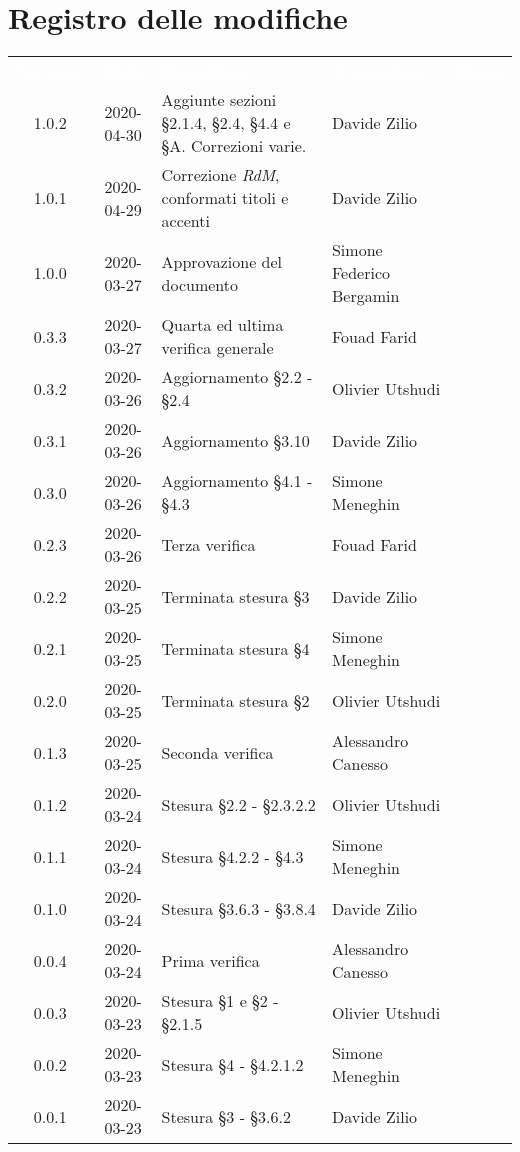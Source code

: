 \section*{Registro delle modifiche}
{
	\centering
	\begin{longtable}{ c c  C{4cm}  C{3cm}  C{3.5cm} }
		\textcolor{white}{\textbf{Versione}} & \textcolor{white}{\textbf{Data}} & \textcolor{white}{\textbf{Descrizione}} & \textcolor{white}{\textbf{Nominativo}} & \textcolor{white}{\textbf{Ruolo}}\\
	1.0.2 & 2020-04-30 & Aggiunte sezioni \S 2.1.4, \S 2.4, \S 4.4 e \S A. Correzioni varie. & Davide Zilio &\adm{} \\
	1.0.1 & 2020-04-29 & Correzione \textit{RdM}, conformati titoli e accenti & Davide Zilio &\adm{} \\	
    1.0.0 & 2020-03-27 & Approvazione del documento & Simone Federico Bergamin &\RdP{} \\
    	0.3.3 & 2020-03-27 & Quarta ed ultima verifica generale & Fouad Farid &\ver{}\\
    	0.3.2 & 2020-03-26 & Aggiornamento \S 2.2 - \S 2.4 & Olivier Utshudi &\adm{}\\
		0.3.1 & 2020-03-26 & Aggiornamento \S 3.10 & Davide Zilio &\adm{}\\
		0.3.0 & 2020-03-26 & Aggiornamento \S 4.1 - \S 4.3  & Simone Meneghin &\adm{}\\
		0.2.3 & 2020-03-26 & Terza verifica & Fouad Farid &\ver{}\\
		0.2.2 & 2020-03-25 & Terminata stesura \S 3  & Davide Zilio &\adm{}\\
    	0.2.1 & 2020-03-25 & Terminata stesura \S 4 & Simone Meneghin &\adm{}\\	
   		0.2.0 & 2020-03-25 & Terminata stesura \S 2 & Olivier Utshudi &\adm{}\\
   		0.1.3 & 2020-03-25 & Seconda verifica & Alessandro Canesso &\ver{}\\
		0.1.2 & 2020-03-24 & Stesura \S 2.2 - \S 2.3.2.2 & Olivier Utshudi &\adm{}\\
		0.1.1 & 2020-03-24 & Stesura \S 4.2.2 - \S 4.3 & Simone Meneghin &\adm{}\\		
		0.1.0 & 2020-03-24 & Stesura \S 3.6.3 - \S 3.8.4 & Davide Zilio &\adm{}\\
		0.0.4 & 2020-03-24 & Prima verifica & Alessandro Canesso &\ver{}\\
		0.0.3 & 2020-03-23 & Stesura \S 1 e \S 2 - \S 2.1.5 & Olivier Utshudi &\adm{}\\
		0.0.2 & 2020-03-23 & Stesura \S 4 - \S 4.2.1.2 & Simone Meneghin &\adm{}\\
		0.0.1 & 2020-03-23 & Stesura \S 3 - \S 3.6.2 & Davide Zilio &\adm{}\\		
	\end{longtable}
}